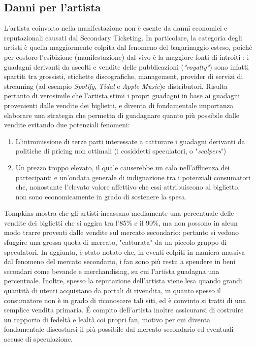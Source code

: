 \subsection{Danni per l'artista}
L'artista coinvolto nella manifestazione non è esente da danni economici e reputazionali causati dal Secondary Ticketing. In particolare, la categoria degli artisti è quella maggiormente colpita dal fenomeno del bagarinaggio esteso, poiché per costoro l'esibizione (manifestazione) dal vivo è la maggiore fonti di introiti \cite{westgate2019}: i guadagni derivanti da ascolti e vendite delle pubblicazioni (\emph{"royalty"}) sono infatti spartiti tra grossisti, etichette discografiche, management, provider di servizi di streaming (ad esempio \textit{Spotify}, \textit{Tidal} e \textit{Apple Music})e distributori. Risulta pertanto di verosimile che l'artista stimi i propri guadagni in base ai guadagni provenienti dalle vendite dei biglietti, e diventa di fondamentale importanza elaborare una strategia che permetta di guadagnare quanto più possibile dalle vendite evitando due potenziali fenomeni: 
\begin{enumerate}
\item L'intromissione di terze parti interessate a catturare i guadagni derivanti da politiche di pricing non ottimali (i cosiddetti speculatori, o "\emph{scalpers}")
\item Un prezzo troppo elevato, il quale causerebbe un calo nell'affluenza dei partecipanti e un'ondata generale di indignazione tra i potenziali consumatori che, nonostante l'elevato valore affettivo che essi attribuiscono al biglietto, non sono economicamente in grado di sostenere la spesa. 
\end{enumerate}
 Tompkins \cite{tompkins2018ticket} mostra che gli artisti incassano mediamente una percentuale delle vendite dei biglietti che si aggira tra l'85\% e il 90\%, ma non possono in alcun modo trarre proventi dalle vendite sul mercato secondario: pertanto si vedono sfuggire una grossa quota di mercato, "catturata" da un piccolo gruppo di speculatori. In aggiunta, è stato notato che, in eventi colpiti in maniera massiva dal fenomeno del mercato secondario, i fan sono più restii a spendere in beni secondari come bevande e merchandising, su cui l'artista guadagna una percentuale. Inoltre, spesso la reputazione dell'artista viene lesa quando grandi quantità di utenti acquistano da portali di rivendita, in quanto spesso il consumatore non è in grado di riconoscere tali siti, ed è convinto si tratti di una semplice vendita primaria. 
\'E compito dell'artista inoltre assicurarsi di costruire un rapporto di fedeltà e lealtà coi propri fan, motivo per cui diventa fondamentale discostarsi il più possibile dal mercato secondario ed eventuali accuse di speculazione. 


